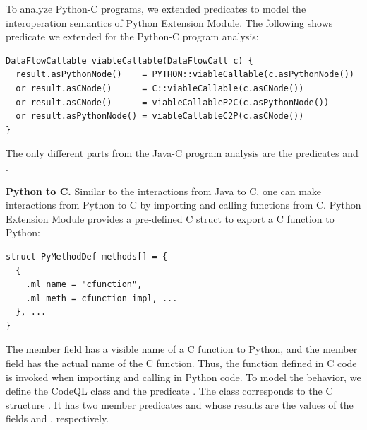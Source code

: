 To analyze Python-C programs, we extended predicates to model the
interoperation semantics of Python Extension Module.
The following shows  predicate we extended for the
Python-C program analysis: 

\begin{lstlisting}[style=codeql,xleftmargin=-.5em,numbers=none]
DataFlowCallable viableCallable(DataFlowCall c) {
  result.asPythonNode()    = PYTHON::viableCallable(c.asPythonNode())
  or result.asCNode()      = C::viableCallable(c.asCNode())
  or result.asCNode()      = viableCallableP2C(c.asPythonNode())
  or result.asPythonNode() = viableCallableC2P(c.asCNode())
}
\end{lstlisting}

\noindent
The only different parts from the Java-C program analysis are the predicates
 and .


\textbf{Python to C.} Similar to the interactions from Java to C, one can make
interactions from Python to C by importing and calling functions from
C. Python Extension Module provides a pre-defined C struct  to
export a C function to Python: 

\begin{lstlisting}[style=mcpp]
struct PyMethodDef methods[] = {
  {
    .ml_name = "cfunction",
    .ml_meth = cfunction_impl, ...
  }, ...
}
\end{lstlisting}

\noindent
The member field  has a visible name of a C function to Python,
and the member field  has the actual name of the C function.
Thus, the function  defined in C code is invoked when
importing and calling  in Python code.
To model the behavior, we define the CodeQL class 
and the predicate . The class 
corresponds to the C structure . It has
two member predicates  and  whose results are
the values of the fields  and , respectively.


